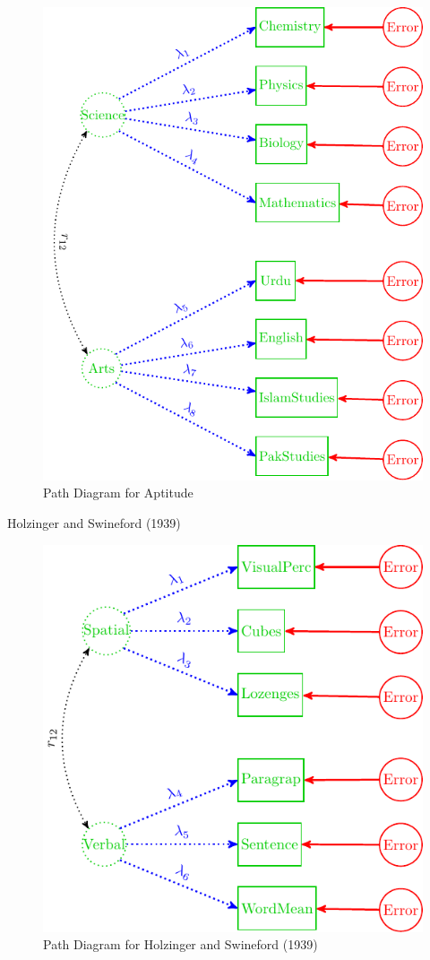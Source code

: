 
\begin{figure}[H]

{\centering \includegraphics[width=0.8\linewidth]{images/Science1} 

}

\caption{Path Diagram for Aptitude}\label{fig:Science1}
\end{figure}

\begin{example}
Holzinger and Swineford (1939)
\end{example}

\begin{figure}[H]

{\centering \includegraphics[width=0.8\linewidth]{images/HSF1} 

}

\caption{Path Diagram for Holzinger and Swineford (1939)}\label{fig:HSF1}
\end{figure}

